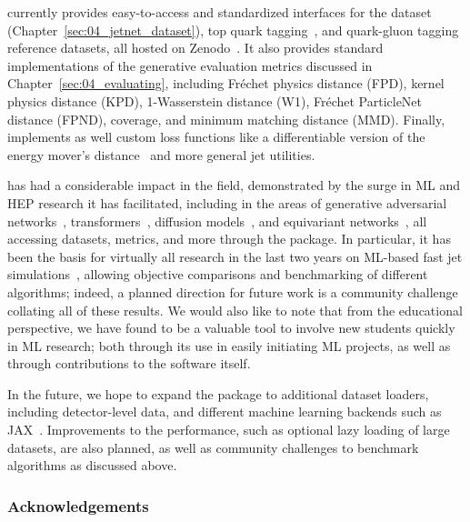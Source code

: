 \jetnet currently provides easy-to-access and standardized interfaces for the \jetnet dataset (Chapter~\ref{sec:04_jetnet_dataset}), top quark tagging~\cite{kasieczka_gregor_2019_2603256, Kasieczka:2019dbj}, and quark-gluon tagging~\cite{komiske_patrick_2019_3164691} reference datasets, all hosted on Zenodo~\cite{Zenodo}. 
It also provides standard implementations of the generative evaluation metrics discussed in Chapter~\ref{sec:04_evaluating}, including Fr\'echet physics distance (FPD), kernel physics distance (KPD), 1-Wasserstein distance (W1), Fr\'echet ParticleNet distance (FPND), coverage, and minimum matching distance (MMD). 
Finally, \jetnet implements as well custom loss functions like a differentiable version of the energy mover's distance~\cite{Komiske:2019fks} and more general jet utilities. 

\jetnet has had a considerable impact in the field, demonstrated by the surge in ML and HEP research it has facilitated, including in the areas of generative adversarial networks~\cite{Kansal:2021cqp}, transformers~\cite{Kach:2022uzq, Kansal:2022spb, Kach:2023rqw},  diffusion models~\cite{Leigh:2023toe, Mikuni:2023dvk}, and equivariant networks~\cite{Hao:2022zns, Buhmann:2023pmh}, all accessing datasets, metrics, and more through the package.
In particular, it has been the basis for virtually all research in the last two years on ML-based fast jet simulations~\cite{Kansal:2021cqp, Kach:2022uzq, Kansal:2022spb, Kach:2023rqw, Leigh:2023toe, Mikuni:2023dvk}, allowing objective comparisons and benchmarking of different algorithms; indeed, a planned direction for future work is a \jetnet community challenge collating all of these results.
We would also like to note that from the educational perspective, we have found \jetnet to be a valuable tool to involve new students quickly in ML research;
both through its use in easily initiating ML projects, as well as through contributions to the software itself.

In the future, we hope to expand the package to additional dataset loaders, including detector-level data, and different machine learning backends such as JAX~\cite{jax2018github}. 
Improvements to the performance, such as optional lazy loading of large datasets, are also planned, as well as community challenges to benchmark algorithms as discussed above.

\subsubsection{Acknowledgements}

